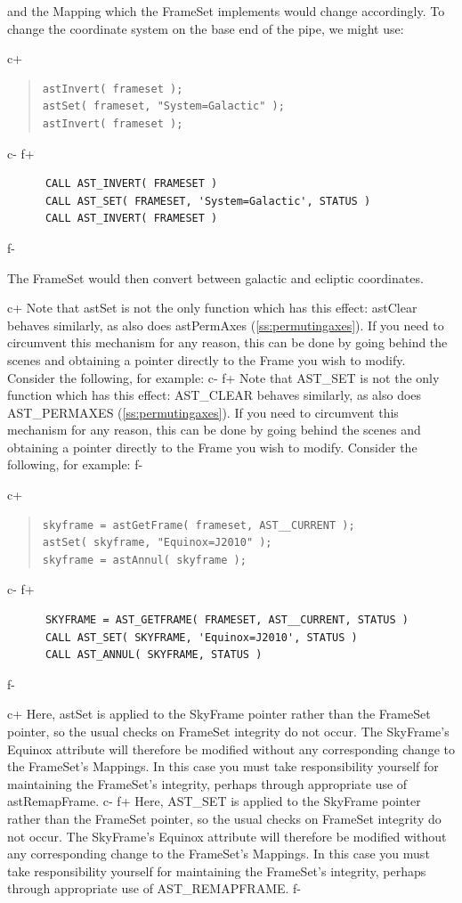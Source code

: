 \documentclass[twoside,11pt]{article}
\newcommand{\secref}[1]{\S\ref{#1}}
\renewcommand{\secref}[1]{\ref{#1}}
\begin{document}
and the Mapping which the FrameSet implements would change
accordingly. To change the coordinate system on the base end of the
pipe, we might use:

c+
\begin{quote}
\small
\begin{verbatim}
astInvert( frameset );
astSet( frameset, "System=Galactic" );
astInvert( frameset );
\end{verbatim}
\normalsize
\end{quote}
c-
f+
\small
\begin{verbatim}
      CALL AST_INVERT( FRAMESET )
      CALL AST_SET( FRAMESET, 'System=Galactic', STATUS )
      CALL AST_INVERT( FRAMESET )
\end{verbatim}
\normalsize
f-

The FrameSet would then convert between galactic and ecliptic
coordinates.

c+
Note that astSet is not the only function which has this effect:
astClear behaves similarly, as also does astPermAxes
(\secref{ss:permutingaxes}). If you need to circumvent this mechanism
for any reason, this can be done by going behind the scenes and
obtaining a pointer directly to the Frame you wish to modify. Consider
the following, for example:
c-
f+
Note that AST\_SET is not the only function which has this effect:
AST\_CLEAR behaves similarly, as also does AST\_PERMAXES
(\secref{ss:permutingaxes}). If you need to circumvent this mechanism
for any reason, this can be done by going behind the scenes and
obtaining a pointer directly to the Frame you wish to modify. Consider
the following, for example:
f-

c+
\begin{quote}
\small
\begin{verbatim}
skyframe = astGetFrame( frameset, AST__CURRENT );
astSet( skyframe, "Equinox=J2010" );
skyframe = astAnnul( skyframe );
\end{verbatim}
\normalsize
\end{quote}
c-
f+
\small
\begin{verbatim}
      SKYFRAME = AST_GETFRAME( FRAMESET, AST__CURRENT, STATUS )
      CALL AST_SET( SKYFRAME, 'Equinox=J2010', STATUS )
      CALL AST_ANNUL( SKYFRAME, STATUS )
\end{verbatim}
\normalsize
f-

c+
Here, astSet is applied to the SkyFrame pointer rather than the
FrameSet pointer, so the usual checks on FrameSet integrity do not
occur. The SkyFrame's Equinox attribute will therefore be modified
without any corresponding change to the FrameSet's Mappings.  In this
case you must take responsibility yourself for maintaining the
FrameSet's integrity, perhaps through appropriate use of
astRemapFrame.
c-
f+
Here, AST\_SET is applied to the SkyFrame pointer rather than the
FrameSet pointer, so the usual checks on FrameSet integrity do not
occur. The SkyFrame's Equinox attribute will therefore be modified
without any corresponding change to the FrameSet's Mappings.  In this
case you must take responsibility yourself for maintaining the
FrameSet's integrity, perhaps through appropriate use of
AST\_REMAPFRAME.
f-
\end{document}

